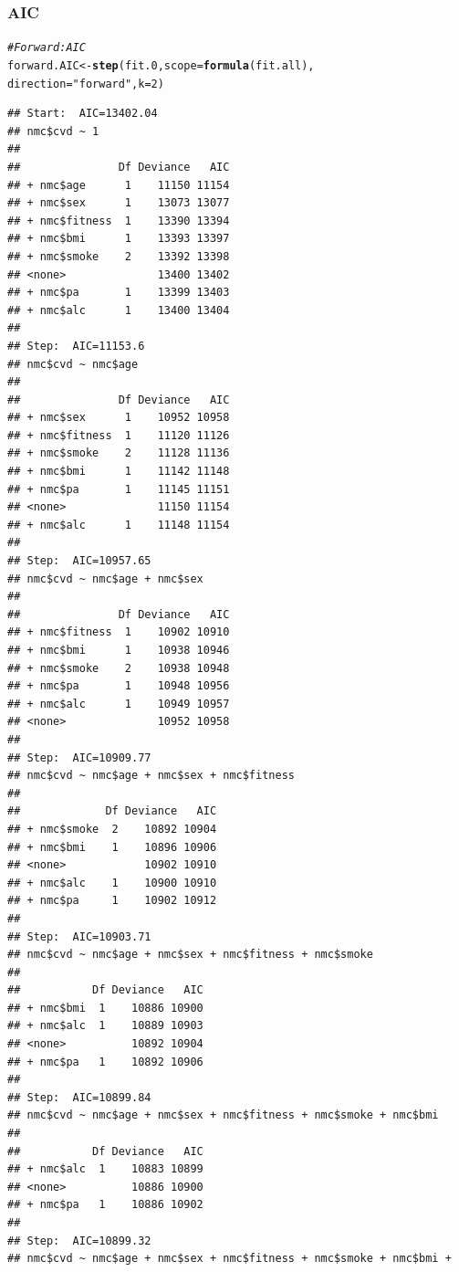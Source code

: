 \documentclass{article}\usepackage[]{graphicx}\usepackage[]{xcolor}
\makeatletter
\newcommand{\hlnum}[1]{\textcolor[rgb]{0.686,0.059,0.569}{#1}}%
\newcommand{\hlstr}[1]{\textcolor[rgb]{0.192,0.494,0.8}{#1}}%
\newcommand{\hlcom}[1]{\textcolor[rgb]{0.678,0.584,0.686}{\textit{#1}}}%
\newcommand{\hlstd}[1]{\textcolor[rgb]{0.345,0.345,0.345}{#1}}%
\newcommand{\hlkwb}[1]{\textcolor[rgb]{0.69,0.353,0.396}{#1}}%
\newcommand{\hlkwc}[1]{\textcolor[rgb]{0.333,0.667,0.333}{#1}}%
\newcommand{\hlkwd}[1]{\textcolor[rgb]{0.737,0.353,0.396}{\textbf{#1}}}%
\newenvironment{kframe}{%
 \def\at@end@of@kframe{}%
 \ifinner\ifhmode%
  \def\at@end@of@kframe{\end{minipage}}%
  \begin{minipage}{\columnwidth}%
 \fi\fi%
 \def\FrameCommand##1{\hskip\@totalleftmargin \hskip-\fboxsep
 \colorbox{shadecolor}{##1}\hskip-\fboxsep
     \hskip-\linewidth \hskip-\@totalleftmargin \hskip\columnwidth}%
 \MakeFramed {\advance\hsize-\width
   \@totalleftmargin\z@ \linewidth\hsize
   \@setminipage}}%
 {\par\unskip\endMakeFramed%
 \at@end@of@kframe}
\newenvironment{knitrout}{}{} %
\makeatother
\begin{document}
        \subsubsection{AIC}
\begin{knitrout}
\color{fgcolor}\begin{kframe}
\begin{alltt}
\hlcom{#Forward: AIC}
\hlstd{forward.AIC} \hlkwb{<-} \hlkwd{step}\hlstd{(fit.0,} \hlkwc{scope}\hlstd{=}\hlkwd{formula}\hlstd{(fit.all),}
                   \hlkwc{direction}\hlstd{=}\hlstr{"forward"}\hlstd{,} \hlkwc{k}\hlstd{=}\hlnum{2}\hlstd{)}
\end{alltt}
\begin{verbatim}
## Start:  AIC=13402.04
## nmc$cvd ~ 1
## 
##               Df Deviance   AIC
## + nmc$age      1    11150 11154
## + nmc$sex      1    13073 13077
## + nmc$fitness  1    13390 13394
## + nmc$bmi      1    13393 13397
## + nmc$smoke    2    13392 13398
## <none>              13400 13402
## + nmc$pa       1    13399 13403
## + nmc$alc      1    13400 13404
## 
## Step:  AIC=11153.6
## nmc$cvd ~ nmc$age
## 
##               Df Deviance   AIC
## + nmc$sex      1    10952 10958
## + nmc$fitness  1    11120 11126
## + nmc$smoke    2    11128 11136
## + nmc$bmi      1    11142 11148
## + nmc$pa       1    11145 11151
## <none>              11150 11154
## + nmc$alc      1    11148 11154
## 
## Step:  AIC=10957.65
## nmc$cvd ~ nmc$age + nmc$sex
## 
##               Df Deviance   AIC
## + nmc$fitness  1    10902 10910
## + nmc$bmi      1    10938 10946
## + nmc$smoke    2    10938 10948
## + nmc$pa       1    10948 10956
## + nmc$alc      1    10949 10957
## <none>              10952 10958
## 
## Step:  AIC=10909.77
## nmc$cvd ~ nmc$age + nmc$sex + nmc$fitness
## 
##             Df Deviance   AIC
## + nmc$smoke  2    10892 10904
## + nmc$bmi    1    10896 10906
## <none>            10902 10910
## + nmc$alc    1    10900 10910
## + nmc$pa     1    10902 10912
## 
## Step:  AIC=10903.71
## nmc$cvd ~ nmc$age + nmc$sex + nmc$fitness + nmc$smoke
## 
##           Df Deviance   AIC
## + nmc$bmi  1    10886 10900
## + nmc$alc  1    10889 10903
## <none>          10892 10904
## + nmc$pa   1    10892 10906
## 
## Step:  AIC=10899.84
## nmc$cvd ~ nmc$age + nmc$sex + nmc$fitness + nmc$smoke + nmc$bmi
## 
##           Df Deviance   AIC
## + nmc$alc  1    10883 10899
## <none>          10886 10900
## + nmc$pa   1    10886 10902
## 
## Step:  AIC=10899.32
## nmc$cvd ~ nmc$age + nmc$sex + nmc$fitness + nmc$smoke + nmc$bmi + 

\end{verbatim}
\end{kframe}
\end{knitrout}
\end{document}
